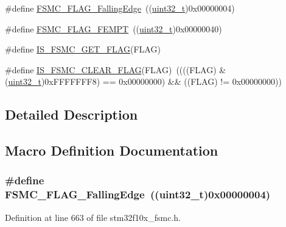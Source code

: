 \begin{DoxyCompactItemize}
\item 
\#define \hyperlink{group___f_s_m_c___flags_gaaaa85bce06ed962874686ad7af0f0cb7}{F\+S\+M\+C\+\_\+\+F\+L\+A\+G\+\_\+\+Falling\+Edge}~((\hyperlink{_p_e___types_8h_a33594304e786b158f3fb30289278f5af}{uint32\+\_\+t})0x00000004)
\item 
\#define \hyperlink{group___f_s_m_c___flags_ga8da2bd0b9d11877aaebaba0c77e8b0cc}{F\+S\+M\+C\+\_\+\+F\+L\+A\+G\+\_\+\+F\+E\+M\+PT}~((\hyperlink{_p_e___types_8h_a33594304e786b158f3fb30289278f5af}{uint32\+\_\+t})0x00000040)
\item 
\#define \hyperlink{group___f_s_m_c___flags_gab8674160ef7884f939e07041bbf5b18b}{I\+S\+\_\+\+F\+S\+M\+C\+\_\+\+G\+E\+T\+\_\+\+F\+L\+AG}(F\+L\+AG)
\item 
\#define \hyperlink{group___f_s_m_c___flags_ga1114bf56b54e726831b38fc8c5daa14e}{I\+S\+\_\+\+F\+S\+M\+C\+\_\+\+C\+L\+E\+A\+R\+\_\+\+F\+L\+AG}(F\+L\+AG)~((((F\+L\+AG) \& (\hyperlink{_p_e___types_8h_a33594304e786b158f3fb30289278f5af}{uint32\+\_\+t})0x\+F\+F\+F\+F\+F\+F\+F8) == 0x00000000) \&\& ((\+F\+L\+A\+G) != 0x00000000))
\end{DoxyCompactItemize}


\subsection{Detailed Description}


\subsection{Macro Definition Documentation}
\subsubsection[{\texorpdfstring{F\+S\+M\+C\+\_\+\+F\+L\+A\+G\+\_\+\+Falling\+Edge}{FSMC_FLAG_FallingEdge}}]{\setlength{\rightskip}{0pt plus 5cm}\#define F\+S\+M\+C\+\_\+\+F\+L\+A\+G\+\_\+\+Falling\+Edge~(({\bf uint32\+\_\+t})0x00000004)}\hypertarget{group___f_s_m_c___flags_gaaaa85bce06ed962874686ad7af0f0cb7}{}\label{group___f_s_m_c___flags_gaaaa85bce06ed962874686ad7af0f0cb7}


Definition at line 663 of file stm32f10x\+\_\+fsmc.\+h.

